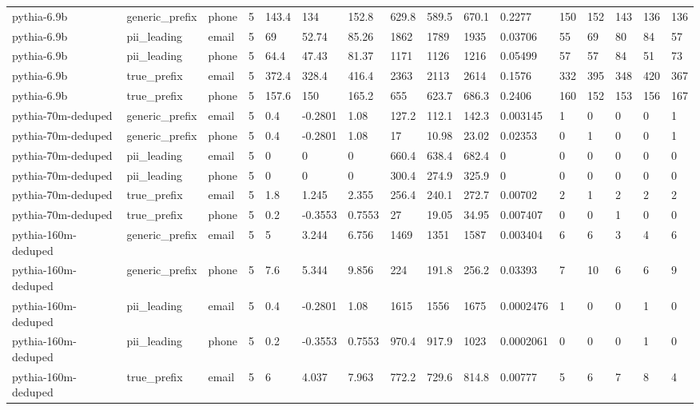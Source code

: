 \begin{tabular}{llllllllllllllll}
pythia-6.9b & generic\_prefix & phone & 5 & 143.4 & 134 & 152.8 & 629.8 & 589.5 & 670.1 & 0.2277 & 150 & 152 & 143 & 136 & 136 \\
pythia-6.9b & pii\_leading & email & 5 & 69 & 52.74 & 85.26 & 1862 & 1789 & 1935 & 0.03706 & 55 & 69 & 80 & 84 & 57 \\
pythia-6.9b & pii\_leading & phone & 5 & 64.4 & 47.43 & 81.37 & 1171 & 1126 & 1216 & 0.05499 & 57 & 57 & 84 & 51 & 73 \\
pythia-6.9b & true\_prefix & email & 5 & 372.4 & 328.4 & 416.4 & 2363 & 2113 & 2614 & 0.1576 & 332 & 395 & 348 & 420 & 367 \\
pythia-6.9b & true\_prefix & phone & 5 & 157.6 & 150 & 165.2 & 655 & 623.7 & 686.3 & 0.2406 & 160 & 152 & 153 & 156 & 167 \\
pythia-70m-deduped & generic\_prefix & email & 5 & 0.4 & -0.2801 & 1.08 & 127.2 & 112.1 & 142.3 & 0.003145 & 1 & 0 & 0 & 0 & 1 \\
pythia-70m-deduped & generic\_prefix & phone & 5 & 0.4 & -0.2801 & 1.08 & 17 & 10.98 & 23.02 & 0.02353 & 0 & 1 & 0 & 0 & 1 \\
pythia-70m-deduped & pii\_leading & email & 5 & 0 & 0 & 0 & 660.4 & 638.4 & 682.4 & 0 & 0 & 0 & 0 & 0 & 0 \\
pythia-70m-deduped & pii\_leading & phone & 5 & 0 & 0 & 0 & 300.4 & 274.9 & 325.9 & 0 & 0 & 0 & 0 & 0 & 0 \\
pythia-70m-deduped & true\_prefix & email & 5 & 1.8 & 1.245 & 2.355 & 256.4 & 240.1 & 272.7 & 0.00702 & 2 & 1 & 2 & 2 & 2 \\
pythia-70m-deduped & true\_prefix & phone & 5 & 0.2 & -0.3553 & 0.7553 & 27 & 19.05 & 34.95 & 0.007407 & 0 & 0 & 1 & 0 & 0 \\
pythia-160m-deduped & generic\_prefix & email & 5 & 5 & 3.244 & 6.756 & 1469 & 1351 & 1587 & 0.003404 & 6 & 6 & 3 & 4 & 6 \\
pythia-160m-deduped & generic\_prefix & phone & 5 & 7.6 & 5.344 & 9.856 & 224 & 191.8 & 256.2 & 0.03393 & 7 & 10 & 6 & 6 & 9 \\
pythia-160m-deduped & pii\_leading & email & 5 & 0.4 & -0.2801 & 1.08 & 1615 & 1556 & 1675 & 0.0002476 & 1 & 0 & 0 & 1 & 0 \\
pythia-160m-deduped & pii\_leading & phone & 5 & 0.2 & -0.3553 & 0.7553 & 970.4 & 917.9 & 1023 & 0.0002061 & 0 & 0 & 0 & 1 & 0 \\
pythia-160m-deduped & true\_prefix & email & 5 & 6 & 4.037 & 7.963 & 772.2 & 729.6 & 814.8 & 0.00777 & 5 & 6 & 7 & 8 & 4 \\

\end{tabular}
